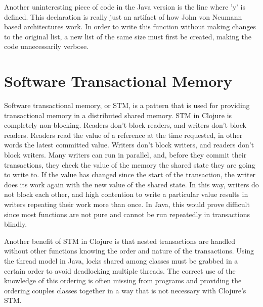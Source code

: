Another uninteresting piece of code in the Java version is the line where 'y' is defined. 
This declaration is really just an artifact of how John von Neumann based architectures work. In order to write this function without making changes to 
the original list, a new list of the same size must first be created, making the code unnecessarily verbose. 

\section{Software Transactional Memory}
Software transactional memory, or STM, is a pattern that is used for providing transactional memory in a distributed shared memory\cite{stm}. STM in Clojure is completely non-blocking. Readers don't block readers, and writers don't block readers. Readers read the value of a reference at the time requested, in other words the latest committed value. Writers don't block writers, and readers don't block writers. Many writers can run in parallel, and, before they commit their transactions, they check the value of the memory the shared state they are going to write to. If the value has changed since the start of the transaction, the writer does its work again with the new value of the shared state. In this way, writers do not block each other, and high contention to write a particular value results in writers repeating their work more than once. In Java, this would prove difficult since most functions are not pure and cannot be run repeatedly in transactions blindly. 

Another benefit of STM in Clojure is that nested transactions are handled without other functions knowing the order and nature of the transactions. Using the thread model in Java, locks shared among classes must be grabbed in a certain order to avoid deadlocking multiple threads. The correct use of the knowledge of this ordering is often missing from programs and providing the ordering couples classes together in a way that is not necessary with Clojure's STM.  

